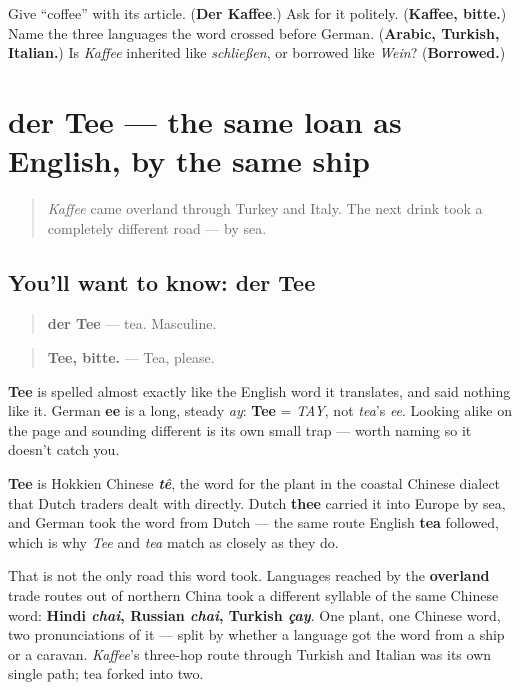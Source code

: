 \begin{tcolorbox}[breakable,colback=teal!4,colframe=teal!35!black,title={Before you move on}]
Give \textquotedblleft{}coffee\textquotedblright{} with its article. (\textbf{Der Kaffee}.) Ask for it politely. (\textbf{Kaffee, bitte.}) Name the three languages the word crossed before German. (\textbf{Arabic, Turkish, Italian.}) Is \emph{Kaffee} inherited like \emph{schließen}, or borrowed like \emph{Wein}? (\textbf{Borrowed.})
\end{tcolorbox}
\section[der Tee]{der Tee — the same loan as English, by the same ship}

\label{lesson:GE-C28-tee}



\begin{quote}
\emph{Kaffee} came overland through Turkey and Italy. The next drink took a completely different road — by sea.
\end{quote}

\subsection*{You'll want to know: der Tee}
\begin{quote}
\textbf{der Tee} — tea. Masculine.
\end{quote}

\begin{quote}
\textbf{Tee, bitte.} — Tea, please.
\end{quote}

\begin{sounds}
\textbf{Tee} is spelled almost exactly like the English word it translates, and said nothing like it. German \textbf{ee} is a long, steady \emph{ay}: \textbf{Tee} = \emph{TAY}, not \emph{tea}'s \emph{ee}. Looking alike on the page and sounding different is its own small trap — worth naming so it doesn't catch you.
\end{sounds}

\begin{cousinweb}
\textbf{Tee} is Hokkien Chinese \emph{\textbf{tê}}, the word for the plant in the coastal Chinese dialect that Dutch traders dealt with directly. Dutch \textbf{thee} carried it into Europe by sea, and German took the word from Dutch — the same route English \textbf{tea} followed, which is why \emph{Tee} and \emph{tea} match as closely as they do.

That is not the only road this word took. Languages reached by the \textbf{overland} trade routes out of northern China took a different syllable of the same Chinese word: \textbf{Hindi \emph{chai}, Russian \emph{chai}, Turkish \emph{çay}}. One plant, one Chinese word, two pronunciations of it — split by whether a language got the word from a ship or a caravan. \emph{Kaffee}'s three-hop route through Turkish and Italian was its own single path; tea forked into two.
\end{cousinweb}

